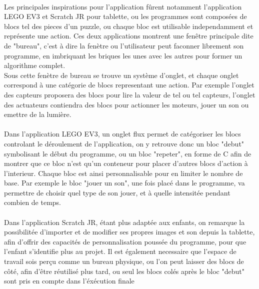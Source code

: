 \documentclass[a4paper]{article}
\begin{document}
\paragraph{}
Les principales inspirations pour l'application fûrent notamment l'application LEGO EV3 et Scratch JR pour tablette, ou les programmes sont composées de blocs tel des pieces d'un puzzle, ou chaque bloc est utilisable independamment et représente une action. Ces deux applications montrent une fenêtre principale dite de "bureau", c'est à dire la fenètre ou l'utilisateur peut faconner librement son programme, en imbriquant les briques les unes avec les autres pour former un algorithme complet.\\
Sous cette fenètre de bureau se trouve un système d'onglet, et chaque onglet correspond à une catégorie de blocs representant une action. Par exemple l'onglet des capteurs proposera des blocs pour lire la valeur de tel ou tel capteurs, l'onglet des actuateurs contiendra des blocs pour actionner les moteurs, jouer un son ou emettre de la lumière.\\

\paragraph{}
Dans l'application LEGO EV3, un onglet flux permet de catégoriser les blocs controlant le déroulement de l'application, on y retrouve donc un bloc "debut" symbolisant le début du programme, ou un bloc "repeter", en forme de C afin de montrer que ce bloc n'est qu'un conteneur pour placer d'autres blocs d'action à l'interieur. Chaque bloc est ainsi personnalisable pour en limiter le nombre de base. Par exemple le bloc "jouer un son", une fois placé dans le programme, va permettre de choisir quel type de son jouer, et à quelle intensitée pendant combien de temps.

\paragraph{}
Dans l'application Scratch JR, étant plus adaptée aux enfants, on remarque la possibilitée d'importer et de modifier ses propres images et son depuis la tablette, afin d'offrir des capacités de personnalisation poussée du programme, pour que l'enfant s'identifie plus au projet. Il est également necessaire que l'espace de travail sois perçu comme un bureau physique, ou l'on peut laisser des blocs de côté, afin d'être réutilisé plus tard, ou seul les blocs colés après le bloc "debut" sont pris en compte dans l'éxécution finale
\end{document}
